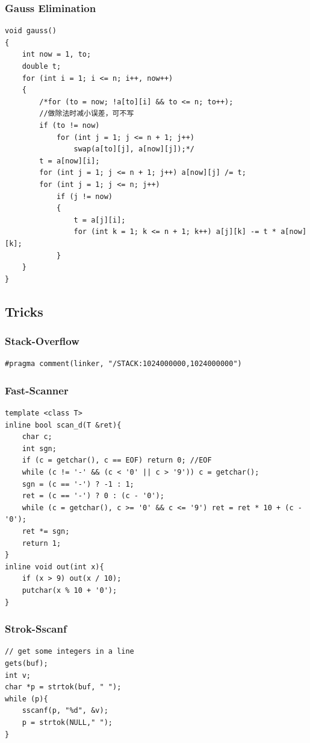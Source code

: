 \documentclass[twoside]{article}
\begin{document}
\subsubsection{Gauss Elimination}
\begin{lstlisting}
void gauss()
{
    int now = 1, to;
    double t;
    for (int i = 1; i <= n; i++, now++)
    {
        /*for (to = now; !a[to][i] && to <= n; to++);
        //做除法时减小误差，可不写
        if (to != now)
            for (int j = 1; j <= n + 1; j++)
                swap(a[to][j], a[now][j]);*/
        t = a[now][i];
        for (int j = 1; j <= n + 1; j++) a[now][j] /= t;
        for (int j = 1; j <= n; j++)
            if (j != now)
            {
                t = a[j][i];
                for (int k = 1; k <= n + 1; k++) a[j][k] -= t * a[now][k];
            }
    }
}
\end{lstlisting}
\subsection{Tricks}
\subsubsection{Stack-Overflow}
\begin{lstlisting}
#pragma comment(linker, "/STACK:1024000000,1024000000")
\end{lstlisting}
\subsubsection{Fast-Scanner}
\begin{lstlisting}
template <class T>
inline bool scan_d(T &ret){
    char c;
    int sgn;
    if (c = getchar(), c == EOF) return 0; //EOF
    while (c != '-' && (c < '0' || c > '9')) c = getchar();
    sgn = (c == '-') ? -1 : 1;
    ret = (c == '-') ? 0 : (c - '0');
    while (c = getchar(), c >= '0' && c <= '9') ret = ret * 10 + (c - '0');
    ret *= sgn;
    return 1;
}
inline void out(int x){
    if (x > 9) out(x / 10);
    putchar(x % 10 + '0');
}
\end{lstlisting}
\subsubsection{Strok-Sscanf}
\begin{lstlisting}
// get some integers in a line
gets(buf);
int v;
char *p = strtok(buf, " ");
while (p){
    sscanf(p, "%d", &v);
    p = strtok(NULL," ");
}
\end{lstlisting}
\end{document}
